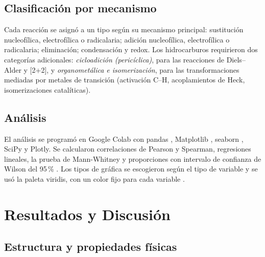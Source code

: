 \documentclass[twoside,twocolumn,10pt]{article}
\begin{document}
\subsection{Clasificación por mecanismo}
Cada reacción se asignó a un tipo según su mecanismo principal: sustitución nucleofílica, electrofílica o radicalaria; adición nucleofílica, electrofílica o radicalaria; eliminación; condensación y redox. Los hidrocarburos requirieron dos categorías adicionales: \textit{cicloadición (pericíclica)}, para las reacciones de Diels–Alder y [2+2], y \textit{organometálica e isomerización}, para las transformaciones mediadas por metales de transición (activación C–H, acoplamientos de Heck, isomerizaciones catalíticas).

\subsection{Análisis}
El análisis se programó en Google Colab con pandas \cite{McKinney2010}, Matplotlib \cite{Hunter2007}, seaborn \cite{Waskom2021}, SciPy \cite{Virtanen2020} y Plotly. Se calcularon correlaciones de Pearson y Spearman, regresiones lineales, la prueba de Mann-Whitney y proporciones con intervalo de confianza de Wilson del 95\,\% \cite{Wilson1927,Brown2001}. Los tipos de gráfica se escogieron según el tipo de variable \cite{Datavizcatalogue} y se usó la paleta viridis, con un color fijo para cada variable \cite{Datawrapper}.

\section{Resultados y Discusión}
\fontsize{12}{14}\selectfont
\subsection{Estructura y propiedades físicas}
\end{document}
